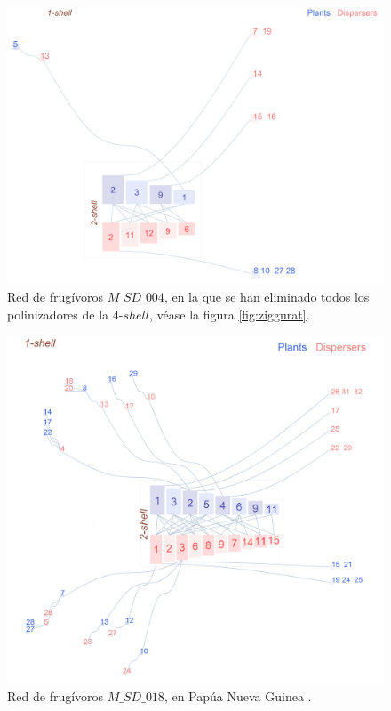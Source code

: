 \clearpage
\begin{figure}[ht!]
\centering
\includegraphics[scale=0.33]{Figures/VIS_M_SD_004_minus_k4_ziggurat.png}
\caption {Red de frugívoros $M\_SD\_004$, en la que se han eliminado todos los polinizadores de la $4$-$shell$, véase la figura \ref{fig:ziggurat}.} 
\label{fig:VIS_M_SD_004_minus_k4_ziggurat}
\end{figure}

\begin{figure}[h!]
\centering
\includegraphics[scale=0.45]{Figures/VIS_M_SD_018_ziggurat.png}
\caption {Red de frugívoros $M\_SD\_018$, en Papúa Nueva Guinea \cite{mack1996notes}.} 
\label{fig:VIS_M_SD_018_ziggurat}
\end{figure}

